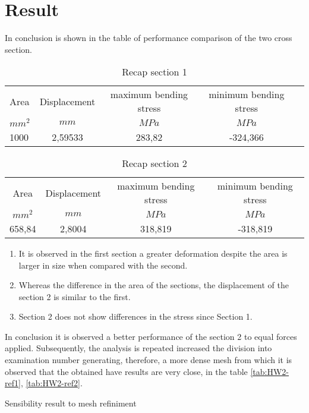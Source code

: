 \section{Result}
In conclusion is shown in the table of performance comparison of the two cross section.\\
\begin{table}[!h]
\centering
\begin{tabular}{lcccc}
\hline
       Area  	& Displacement & maximum bending stress	 & minimum bending stress\\
    $mm^2$ &	 $mm$			& $MPa$				& $MPa$\\
\hline
       	1000	&	2,59533		&283,82				&-324,366\\
\hline
\end{tabular}
\caption{Recap section 1}
\label{table:HW2:RecapSec1}
\end{table}
\begin{table}[!h]
\centering
\begin{tabular}{cccc}
\hline
       Area  & Displacement 	& maximum 	bending stress	& minimum bending stress\\
    $mm^2$ &	 $mm$			& $MPa$				& $MPa$\\
\hline
    658,84	&	2,8004			&	318,819			&	-318,819\\
\hline
\end{tabular}
\caption{Recap section 2}
\label{table:HW2:RecapSec2}
\end{table}
\begin{enumerate}
\item It is observed in the first section a greater deformation despite the area is larger in size when compared with the second.
\item Whereas the difference in the area of the sections, the displacement of the section 2 is similar to the first.
\item Section 2 does not show differences in the stress since Section 1.
\end{enumerate}
In conclusion it is observed a better performance of the section 2 to equal forces applied.
Subsequently, the analysis is repeated increased the division into examination number generating, therefore, a more dense mesh from which it is observed that the obtained have results are very close, in the table \ref{tab:HW2-ref1}, \ref{tab:HW2-ref2}.
\begin{table}[!h]
\centering

\caption{Sensibility result to mesh refiniment}
\label{tab:HW2-ref1}
\end{table}

